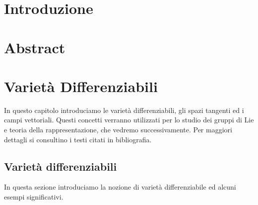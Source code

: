 \documentclass[12pt,a4paper]{report}
\theoremstyle{definition}
\theoremstyle{definition}
\theoremstyle{definition}
\theoremstyle{definition}
\begin{document}
	\chapter*{Introduzione}
	\chapter*{Abstract}
\chapter{Varietà Differenziabili}
In questo capitolo introduciamo le varietà differenziabili, gli spazi tangenti ed i campi vettoriali. Questi concetti verranno utilizzati per lo studio dei gruppi di Lie e teoria della rappresentazione, che vedremo successivamente. Per maggiori dettagli si consultino i testi citati in bibliografia.
\section{Varietà differenziabili}
In questa sezione introduciamo la nozione di varietà differenziabile ed alcuni esempi significativi. 
\end{document}

